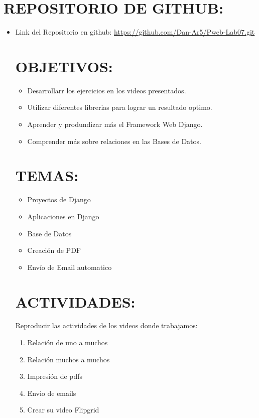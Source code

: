 \documentclass{article}
\begin{document}
\section{REPOSITORIO DE GITHUB:}
	\begin{itemize}		
 \item Link del Repositorio en github: \url{https://github.com/Dan-Ar5/Pweb-Lab07.git}

\section{OBJETIVOS:}
	\begin{itemize}		
 \item Desarrollarr los ejercicios en los videos presentados.
 \item Utilizar diferentes librerias para lograr un resultado optimo.
 \item Aprender y produndizar más el Framework Web Django.
 \item Comprender más sobre relaciones en las Bases de Datos.

	\end{itemize}

 \section{TEMAS:}
	\begin{itemize}		
 \item  Proyectos de Django
 \item Aplicaciones en Django
 \item Base de Datos
 \item Creación de PDF
 \item Envío de Email automatico
	\end{itemize}

 \section{ACTIVIDADES:}
Reproducir las actividades de los videos donde trabajamos:
\begin{enumerate}
  \item Relación de uno a muchos
  \item Relación muchos a muchos
  \item Impresión de pdfs
  \item Envio de emails
  \item Crear su video Flipgrid

\end{enumerate}


	\end{itemize}
\end{document}
